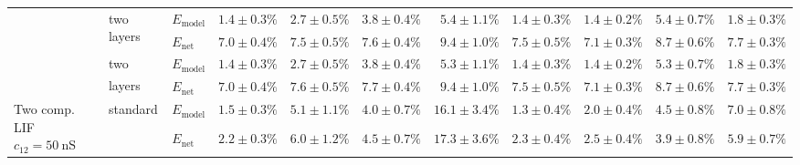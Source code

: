 \begin{sidewaystable}
\begin{tabular}{p{2.2cm} p{1.7cm} l r r r r r r r r }
	\\\cmidrule(l){2-11}
	&
	\multirow{2}{1.7cm}{\raggedleft two layers} &
	$E_\mathrm{model}$ & 
	\color{Gray}$1.4 \pm 0.3\%$ & \color{Gray}$2.7 \pm 0.5\%$ & \color{Gray}$3.8 \pm 0.4\%$ & \color{Gray}$5.4 \pm 1.1\%$ & \color{Gray}$1.4 \pm 0.3\%$ & \color{Gray}$1.4 \pm 0.2\%$ & \color{Gray}$5.4 \pm 0.7\%$ & \color{Gray}$1.8 \pm 0.3\%$
	\\
	& & 
	$E_\mathrm{net}$ &
	\cellcolor{White!50!SteelBlue}$7.0 \pm 0.4\%$ & \cellcolor{White!75!SteelBlue}$7.5 \pm 0.5\%$ & \cellcolor{White!50!SteelBlue}$7.6 \pm 0.4\%$ & \cellcolor{White!94!SteelBlue}$9.4 \pm 1.0\%$ & \cellcolor{White!50!SteelBlue}$7.5 \pm 0.5\%$ & \cellcolor{White!44!SteelBlue}$7.1 \pm 0.3\%$ & \cellcolor{White!44!SteelBlue}$8.7 \pm 0.6\%$ & \cellcolor{White!44!SteelBlue}$7.7 \pm 0.3\%$
	\\\cmidrule(l){2-11}
	&
	\multirow{2}{1.7cm}{\raggedleft two layers\textsuperscript{\dag}} &
	$E_\mathrm{model}$ & 
	\color{Gray}$1.4 \pm 0.3\%$ & \color{Gray}$\mathbf{2.7 \pm 0.5\%}$ & \color{Gray}$3.8 \pm 0.4\%$ & \color{Gray}$\mathbf{5.3 \pm 1.1\%}$ & \color{Gray}$1.4 \pm 0.3\%$ & \color{Gray}$\mathbf{1.4 \pm 0.2\%}$ & \color{Gray}$5.3 \pm 0.7\%$ & \color{Gray}$\mathbf{1.8 \pm 0.3\%}$
	\\
	& & 
	$E_\mathrm{net}$ &
	\cellcolor{White!44!SteelBlue}$7.0 \pm 0.4\%$ & \cellcolor{White!69!SteelBlue}$7.6 \pm 0.5\%$ & \cellcolor{White!44!SteelBlue}$7.7 \pm 0.4\%$ & \cellcolor{White!100!SteelBlue}$\mathbf{9.4 \pm 1.0\%}$ & \cellcolor{White!44!SteelBlue}$7.5 \pm 0.5\%$ & \cellcolor{White!38!SteelBlue}$7.1 \pm 0.3\%$ & \cellcolor{White!50!SteelBlue}$8.7 \pm 0.6\%$ & \cellcolor{White!50!SteelBlue}$7.7 \pm 0.3\%$
	\\\midrule
	\multirow{8}{2.2cm}{\raggedleft %
	Two comp. LIF $c_{12} = \SI{50}{\nano\siemens}$} &
	\multirow{2}{1.7cm}{\raggedleft %
	standard} &
	$E_\mathrm{model}$ & 
	\color{Gray}$1.5 \pm 0.3\%$ & \color{Gray}$5.1 \pm 1.1\%$ & \color{Gray}$4.0 \pm 0.7\%$ & \color{Gray}$16.1 \pm 3.4\%$ & \color{Gray}$1.3 \pm 0.4\%$ & \color{Gray}$2.0 \pm 0.4\%$ & \color{Gray}$4.5 \pm 0.8\%$ & \color{Gray}$7.0 \pm 0.8\%$
	\\
	& & 
	$E_\mathrm{net}$ &
	\cellcolor{White!94!SteelBlue}$2.2 \pm 0.3\%$ & \cellcolor{White!94!SteelBlue}$6.0 \pm 1.2\%$ & \cellcolor{White!94!SteelBlue}$4.5 \pm 0.7\%$ & \cellcolor{White!75!SteelBlue}$17.3 \pm 3.6\%$ & \cellcolor{White!94!SteelBlue}$2.3 \pm 0.4\%$ & \cellcolor{White!94!SteelBlue}$2.5 \pm 0.4\%$ & \cellcolor{White!94!SteelBlue}$3.9 \pm 0.8\%$ & \cellcolor{White!88!SteelBlue}$5.9 \pm 0.7\%$

\end{tabular}
\end{sidewaystable}

